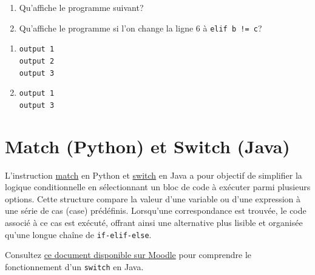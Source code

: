 \begin{Exercice}[5 minutes] 
    \begin{enumerate}
        \item Qu'affiche le programme suivant? 
         
        \item Qu'affiche le programme si l'on change la ligne 6 à \verb|elif b != c|?
    \end{enumerate}

    

    \begin{solution}
        \begin{enumerate}
        \item \texttt{output 1}\\
        \texttt{output 2}\\
        \texttt{output 3}
        \item \texttt{output 1}\\
        \texttt{output 3}
        \end{enumerate}
    \end{solution}
    
\end{Exercice}

\section{Match (Python) et Switch (Java)}
L'instruction \href{https://docs.python.org/fr/3.13/tutorial/controlflow.html#tut-match}{match} en Python et
\href{https://docs.oracle.com/javase/tutorial/java/nutsandbolts/switch.html}{switch} en Java a 
pour objectif de simplifier la logique conditionnelle 
en sélectionnant un bloc de code à exécuter parmi plusieurs 
options. Cette structure compare la valeur d'une variable ou 
d'une expression à une série de cas (case) prédéfinis. 
Lorsqu'une correspondance est trouvée, le code associé à ce 
cas est exécuté, offrant ainsi une alternative plus lisible et 
organisée qu'une longue chaîne de \texttt{if-elif-else}. \newline 


Consultez \href{https://moodle.unil.ch/pluginfile.php/3705947/mod_resource/content/8/jswitch.pdf}{ce document disponible sur Moodle}
pour comprendre le fonctionnement d'un \texttt{switch} en Java.  \newline 

